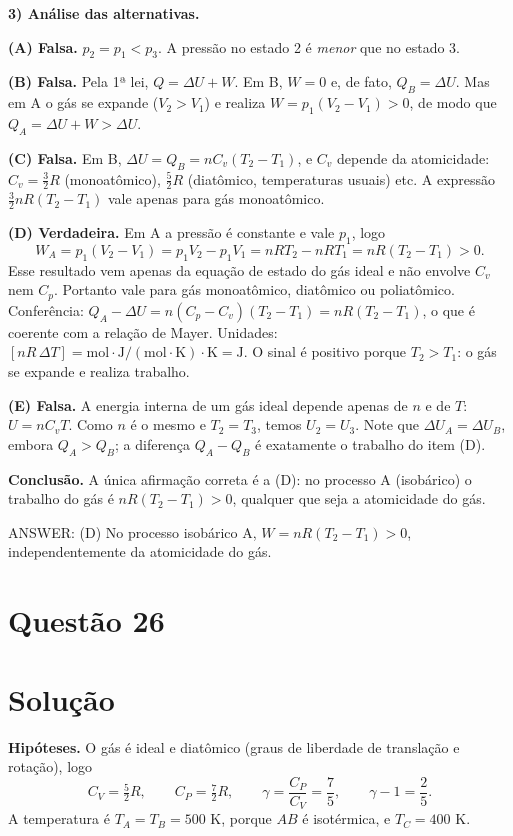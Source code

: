 \documentclass{article}%
\begin{document}
\textbf{3) Análise das alternativas.}

\textbf{(A) Falsa.} $p_2 = p_1 < p_3$. A pressão no estado 2 é \emph{menor} que no estado 3.

\textbf{(B) Falsa.} Pela 1ª lei, $Q = \Delta U + W$. Em B, $W = 0$ e, de fato, $Q_B = \Delta U$. Mas em A o gás se expande ($V_2 > V_1$) e realiza $W = p_1(V_2 - V_1) > 0$, de modo que $Q_A = \Delta U + W > \Delta U$.

\textbf{(C) Falsa.} Em B, $\Delta U = Q_B = nC_v(T_2 - T_1)$, e $C_v$ depende da atomicidade: $C_v = \tfrac{3}{2}R$ (monoatômico), $\tfrac{5}{2}R$ (diatômico, temperaturas usuais) etc. A expressão $\tfrac{3}{2}nR(T_2-T_1)$ vale apenas para gás monoatômico.

\textbf{(D) Verdadeira.} Em A a pressão é constante e vale $p_1$, logo
\[
W_A = p_1(V_2 - V_1) = p_1V_2 - p_1V_1 = nRT_2 - nRT_1 = nR(T_2 - T_1) > 0 .
\]
Esse resultado vem apenas da equação de estado do gás ideal e não envolve $C_v$ nem $C_p$. Portanto vale para gás monoatômico, diatômico ou poliatômico. Conferência: $Q_A - \Delta U = n(C_p - C_v)(T_2-T_1) = nR(T_2-T_1)$, o que é coerente com a relação de Mayer. Unidades: $[nR\,\Delta T] = \text{mol}\cdot\text{J}/(\text{mol}\cdot\text{K})\cdot\text{K} = \text{J}$. O sinal é positivo porque $T_2 > T_1$: o gás se expande e realiza trabalho.

\textbf{(E) Falsa.} A energia interna de um gás ideal depende apenas de $n$ e de $T$: $U = nC_vT$. Como $n$ é o mesmo e $T_2 = T_3$, temos $U_2 = U_3$. Note que $\Delta U_A = \Delta U_B$, embora $Q_A > Q_B$; a diferença $Q_A - Q_B$ é exatamente o trabalho do item (D).

\textbf{Conclusão.} A única afirmação correta é a (D): no processo A (isobárico) o trabalho do gás é $nR(T_2-T_1) > 0$, qualquer que seja a atomicidade do gás.

ANSWER: (D) No processo isobárico A, $W = nR(T_2 - T_1) > 0$, independentemente da atomicidade do gás.%
\newpage%
\section*{Questão 26}

\section*{Solução}

\textbf{Hipóteses.} O gás é ideal e diatômico (graus de liberdade de translação e rotação), logo
\[
C_V=\tfrac{5}{2}R,\qquad C_P=\tfrac{7}{2}R,\qquad \gamma=\frac{C_P}{C_V}=\frac{7}{5},\qquad \gamma-1=\frac{2}{5}.
\]
A temperatura é $T_A=T_B=500$ K, porque $AB$ é isotérmica, e $T_C=400$ K.
\end{document}
